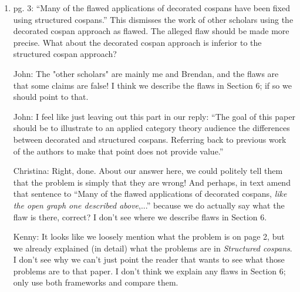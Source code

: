 \documentclass[reqno]{amsart}
\def\chris{\color{purple} Christina: }
\def\john{\color{red} John: }
\def\kenny{\color{blue} Kenny: }
\begin{document}
\begin{enumerate}
{\john He thought we were being dismissive because he didn't know that the ``tricks'' were all things I'd done myself!  If he looked at [1, Section 5] 
he'd see it was me coming up with a bunch of tricks to try to save the decorated cospan category of open graphs, and then Kenny and me explaining why 
this tricks don't work.  So maybe I should just delete ``despite all the tricks one might try''.  Sound good?}

{\chris Sounds good to me! See above, amend at will.}

{\kenny Sounds good.}

\item pg. 3: “Many of the flawed applications of decorated cospans have been fixed using structured cospans.” This dismisses the work of other 
scholars 
using the decorated cospan approach as flawed. The alleged flaw should be made more precise. What about the decorated cospan approach is inferior to 
the structured cospan approach? 

{\john The "other scholars" are mainly me and Brendan, and the flaws are that some claims are false! I think we describe the flaws in Section 6; if so 
we should point to that.}   

{\john I feel like just leaving out this part in our reply: ``The goal of this paper should be to illustrate to an applied category theory audience the differences between 
decorated and structured cospans. Referring back to previous work of the authors to make that point does not provide value.''}

{\chris Right, done. About our answer here, we could politely tell them that the problem is simply that they are wrong! And perhaps, in 
text amend that sentence to ``Many of the flawed applications of decorated cospans, \emph{like the open graph one described above},...'' because we 
do actually say what the flaw is there, correct? I don't see where we describe flaws in Section 6.}

{\kenny It looks like we loosely mention what the problem is on page 2, but we already explained (in detail) what the problems are in \emph{Structured cospans}. I don't see why we can't just point the reader that wants to see what those problems are to that paper. I don't think we explain any flaws in Section 6; only use both frameworks and compare them.}


\end{enumerate}
\end{document}
